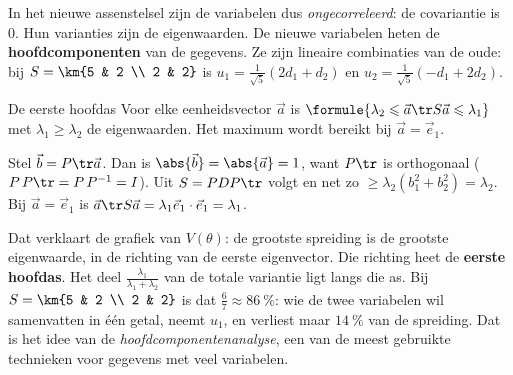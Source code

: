In het nieuwe assenstelsel zijn de variabelen dus \textit{ongecorreleerd}: de covariantie is 0. Hun varianties zijn de eigenwaarden. De nieuwe variabelen heten de \textbf{hoofdcomponenten} van de gegevens. Ze zijn lineaire combinaties van de oude: bij $S = \km{5 & 2 \\ 2 & 2}$ is $u_1 = \frac{1}{\sqrt5}(2d_1 + d_2)$ en $u_2 = \frac{1}{\sqrt5}(-d_1 + 2d_2)$.

\begin{theorie}
\begin{stelling}{De eerste hoofdas}
Voor elke eenheidsvector $\vec a$ is \qquad $\formule{\lambda_2 \leqslant \vec a\tr S\vec a \leqslant \lambda_1}$ \qquad met $\lambda_1 \geqslant \lambda_2$ de eigenwaarden. Het maximum wordt bereikt bij $\vec a = \vec e_1$.
\end{stelling}

\begin{bewijs}
Stel $\vec b = P\tr\vec a$. Dan is $\abs{\vec b} = \abs{\vec a} = 1$, want $P\tr$ is orthogonaal ($P\,P\tr = P\,P^{-1} = I$). Uit $S = PDP\tr$ volgt
en net zo $\geqslant \lambda_2(b_1^2 + b_2^2) = \lambda_2$. Bij $\vec a = \vec e_1$ is $\vec a\tr S\vec a = \lambda_1\vec e_1 \cdot \vec e_1 = \lambda_1$.
\end{bewijs}
\end{theorie}

Dat verklaart de grafiek van $V(\theta)$: de grootste spreiding is de grootste eigenwaarde, in de richting van de eerste eigenvector. Die richting heet de \textbf{eerste hoofdas}. Het deel $\frac{\lambda_1}{\lambda_1 + \lambda_2}$ van de totale variantie ligt langs die as. Bij $S = \km{5 & 2 \\ 2 & 2}$ is dat $\frac67 \approx 86~\%$: wie de twee variabelen wil samenvatten in één getal, neemt $u_1$, en verliest maar $14~\%$ van de spreiding. Dat is het idee van de \textit{hoofdcomponentenanalyse}, een van de meest gebruikte technieken voor gegevens met veel variabelen.


